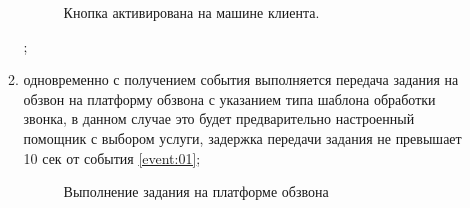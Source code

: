 \documentclass[russian,utf8,12pt,emptystyle]{eskdtext}
\begin{document}
\begin{enumerate}
\begin{enumerate}
\begin{figure}[h]
\begin{center}
\end{center}
\caption{Кнопка активирована на машине клиента.}
\label{ris:image6}
\end{figure};
\newpage
\item одновременно с получением события выполняется передача задания на обзвон на платформу обзвона с указанием типа шаблона обработки звонка, в данном случае это будет предварительно настроенный помощник с выбором услуги, задержка передачи задания не превышает 10 сек от события \ref{event:01}\label{event:02};
\begin{figure}[h]
\begin{center}
\end{center}
\caption{Выполнение задания на платформе обзвона}
\label{ris:image7}
\end{figure}



\end{enumerate}
\end{enumerate}
\end{document}
